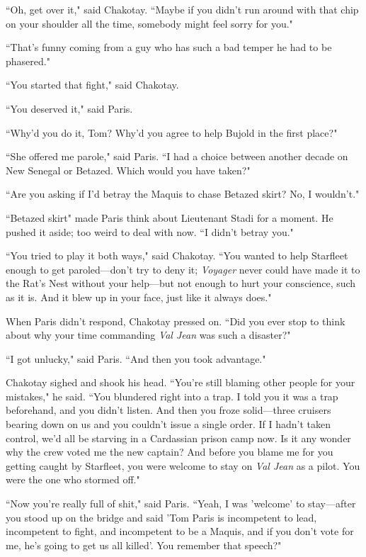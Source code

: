 \documentclass[twoside,letterpaper,12pt]{memoir}
\begin{document}
``Oh, get over it," said Chakotay. ``Maybe if you didn't run around with that chip on your shoulder all the time, somebody might feel sorry for you."

``That's funny coming from a guy who has such a bad temper he had to be phasered."

``You started that fight," said Chakotay.

``You deserved it," said Paris.

``Why'd you do it, Tom? Why'd you agree to help Bujold in the first place?"

``She offered me parole," said Paris. ``I had a choice between another decade on New Senegal or Betazed. Which would you have taken?"

``Are you asking if I'd betray the Maquis to chase Betazed skirt? No, I wouldn't."

``Betazed skirt" made Paris think about Lieutenant Stadi for a moment. He pushed it aside; too weird to deal with now. ``I didn't betray you."

``You tried to play it both ways," said Chakotay. ``You wanted to help Starfleet enough to get paroled---don't try to deny it; \textit{Voyager} never could have made it to the Rat's Nest without your help---but not enough to hurt your conscience, such as it is. And it blew up in your face, just like it always does."

When Paris didn't respond, Chakotay pressed on. ``Did you ever stop to think about why your time commanding \textit{Val Jean} was such a disaster?"

``I got unlucky," said Paris. ``And then you took advantage."

Chakotay sighed and shook his head. ``You're still blaming other people for your mistakes," he said. ``You blundered right into a trap. I told you it was a trap beforehand, and you didn't listen. And then you froze solid---three cruisers bearing down on us and you couldn't issue a single order. If I hadn't taken control, we'd all be starving in a Cardassian prison camp now. Is it any wonder why the crew voted me the new captain? And before you blame me for you getting caught by Starfleet, you were welcome to stay on \textit{Val Jean} as a pilot. You were the one who stormed off."

``Now you're really full of shit," said Paris. ``Yeah, I was 'welcome' to stay---after you stood up on the bridge and said 'Tom Paris is incompetent to lead, incompetent to fight, and incompetent to be a Maquis, and if you don't vote for me, he's going to get us all killed'. You remember that speech?"
\end{document}
